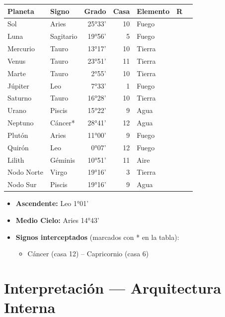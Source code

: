 \documentclass[11pt,a4paper]{article}\usepackage[utf8]{inputenc}
\begin{document}
\begin{center}
\begin{tabular}{llrrlll}
  \toprule
  \textbf{Planeta} & \textbf{Signo} & \textbf{Grado} & \textbf{Casa} &
  \textbf{Elemento} & \textbf{R} \\
  \midrule
  Sol & Aries & 25°33' & 10 & Fuego &  \\
  Luna & Sagitario & 19°56' & 5 & Fuego &  \\
  Mercurio & Tauro & 13°17' & 10 & Tierra &  \\
  Venus & Tauro & 23°51' & 11 & Tierra &  \\
  Marte & Tauro & 2°55' & 10 & Tierra &  \\
  Júpiter & Leo & 7°33' & 1 & Fuego &  \\
  Saturno & Tauro & 16°28' & 10 & Tierra &  \\
  Urano & Piscis & 15°22' & 9 & Agua &  \\
  Neptuno & Cáncer* & 28°41' & 12 & Agua &  \\
  Plutón & Aries & 11°00' & 9 & Fuego &  \\
  Quirón & Leo & 0°07' & 12 & Fuego &  \\
  Lilith & Géminis & 10°51' & 11 & Aire &  \\
  Nodo Norte & Virgo & 19°16' & 3 & Tierra &  \\
  Nodo Sur & Piscis & 19°16' & 9 & Agua &  \\
  \bottomrule
\end{tabular}
\end{center}

\vspace{0.5cm}
\begin{itemize}
  \item \textbf{Ascendente:} Leo 1°01'
  \item \textbf{Medio Cielo:} Aries 14°43'
  \item \textbf{Signos interceptados} (marcados con * en la tabla):
  \begin{itemize}
  \item Cáncer (casa 12) -- Capricornio (casa 6)
  \end{itemize}
\end{itemize}

\newpage

\section{Interpretación — Arquitectura Interna}
\end{document}

